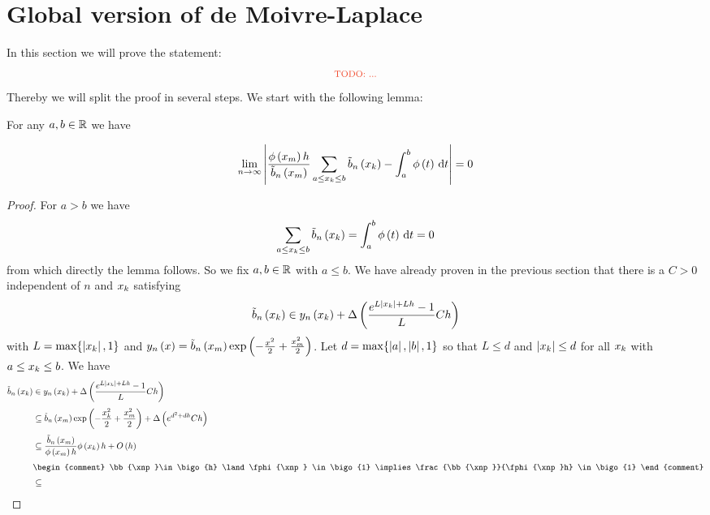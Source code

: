 
\section{Global version of de Moivre-Laplace}

In this section we will prove the statement:
\begin{align}
  \text{\todo{...}}
\end{align}
Thereby we will split the proof in several steps. We start with the following lemma:

\newcommand*{\bnp}{\bb{\xnp}}

\begin{lemma}
  For any $a,b \in \mathbb R$ we have

  \begin{align}
    \lim_{n\to\infty} \left|{\frac{\phi\left( {x_{m}} \right)h}{\tilde b_{n}\left({x_{m}}\right)} \sum_{a\le x_{k}\le b} \tilde b_{n}\left({x_{k}}\right) - \int_a^b \phi\left( {t} \right)\,\mathrm d{t}}\right| = 0
  \end{align}
\end{lemma}

\begin{proof}
  For $a > b$ we have
  \begin{align}
    \sum_{a\le x_{k} \le b}\tilde b_{n}\left({x_{k}}\right) = \int_a^b \phi\left( {t} \right)\,\mathrm d{t} = 0
  \end{align}
  from which directly the lemma follows. So we fix $a,b\in\mathbb R$ with $a\le b$. We have already proven in the previous section that there is a $C > 0$ independent of $n$ and $x_{k}$ satisfying
  \begin{align}
    \tilde b_{n}\left({x_{k}}\right) \in y_{n}\left({x_{k}}\right) + \Delta\left( {\frac{e^{L\left|{x_{k}}\right|+Lh}-1}L Ch} \right)
  \end{align}
  with $L = \max\{\left|{x_{k}}\right|,1\}$ and $y_{n}\left({x}\right) = \tilde b_{n}\left({x_{m}}\right)\exp\left( {-\frac{x^2}2+\frac{x_{m}^2}2} \right)$. Let $d = \max\{\left|{a}\right|,\left|{b}\right|, 1\}$ so that $L \le d$ and $\left|{x_{k}}\right| \le d$ for all $x_{k}$ with $a\le x_{k} \le b$. We have
  \begin{align}
    \bb{\x} & \in \phin{\x} + \bigabs{\frac{\fe{L\abs{\x}+Lh}-1}L Ch} \nl
    &\subseteq \bb{\xnp} \fexp{-\frac{\x^2}2+\frac{\xnp^2}2} + \bigabs{\fe{d^2+dh} C h} \nl
    &\subseteq \frac{\bnp}{\fphi{\xnp}h}  \fphi{\x}h + \bigo{h} \nl
    &
    \begin{comment}
      \bnp \in \bigo{h} \land \fphi{\xnp} \in \bigo{1} \implies \frac{\bnp}{\fphi{\xnp}h} \in \bigo{1}
    \end{comment} \nl
    & \subseteq
  \end{align}
\end{proof}

